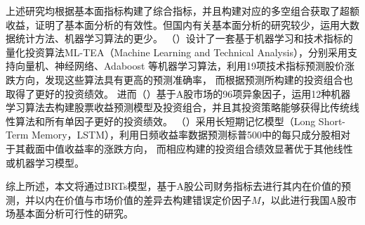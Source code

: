 上述研究均根据基本面指标构建了综合指标，并且构建对应的多空组合获取了超额收益，证明了基本面分析的有效性。但国内有关基本面分析的研究较少，运用大数据统计方法、机器学习算法的更少。
\citeauthor{liMLTEAYiTaoJiYuJiQiXueXiHeJiShuFenXiDeLiangHuaTouZiSuanFa2017}（\citeyear{liMLTEAYiTaoJiYuJiQiXueXiHeJiShuFenXiDeLiangHuaTouZiSuanFa2017}）设计了一套基于机器学习和技术指标的量化投资算法ML-TEA（Machine Learning and Technical Analysis），分别采用支持向量机、神经网络、Adaboost 等机器学习算法，利用19项技术指标预测股价涨跌方向，发现这些算法具有更高的预测准确率， 而根据预测所构建的投资组合也取得了更好的投资绩效。
进而\citeauthor{liJiQiXueXiQuDongDeJiBenMianLiangHuaTouZiYanJiu2019}（\citeyear{liJiQiXueXiQuDongDeJiBenMianLiangHuaTouZiYanJiu2019}）基于A股市场的96项异象因子，运用12种机器学习算法去构建股票收益预测模型及投资组合，并且其投资策略能够获得比传统线性算法和所有单因子更好的投资绩效。
\citeauthor{fischerDeepLearningLong2018}（\citeyear{fischerDeepLearningLong2018}）采用长短期记忆模型（Long Short-Term Memory，LSTM），利用日频收益率数据预测标普500中的每只成分股相对于其截面中值收益率的涨跌方向， 而相应构建的投资组合绩效显著优于其他线性或机器学习模型。

综上所述，本文将通过BRTs模型，基于A股公司财务指标去进行其内在价值的预测，并以内在价值与市场价值的差异去构建错误定价因子$M$，以此进行我国A股市场基本面分析可行性的研究。


